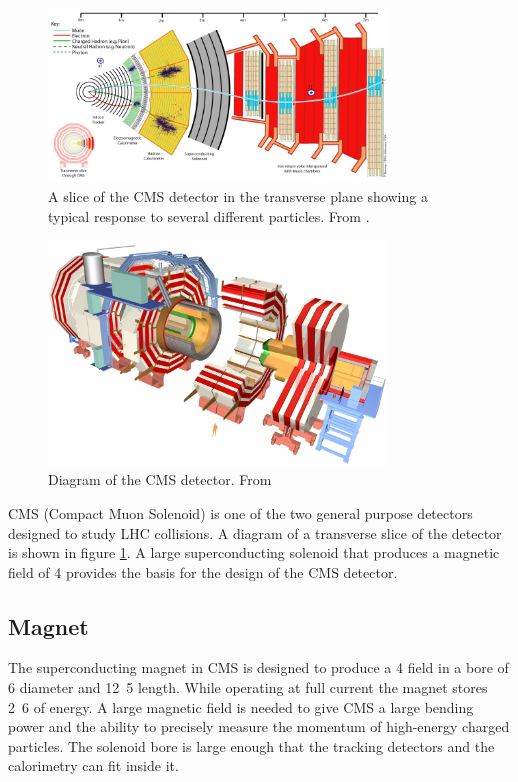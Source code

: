 \begin{figure}[htb!]
  \centering
  \includegraphics[width=0.8\textwidth]{CMS_Slice}
  \caption{A slice of the CMS detector in the transverse plane showing a
  \label{fig:CMS_Slice}
typical response to several different particles. 
From \cite{cmsSlice}.}
\end{figure}

\begin{figure}[htb!]
  \centering
  \includegraphics[width=0.8\textwidth]{CMSnc}
  \caption{Diagram of the CMS detector. From \cite{cms}}
  \label{fig:CMSnc}
\end{figure}

CMS (Compact Muon Solenoid)\cite{cms} is one of the two general purpose
detectors designed to study LHC collisions. 
A diagram of a transverse slice of the detector is shown in figure
\ref{fig:CMS_Slice}. 
A large superconducting solenoid that produces a magnetic field of
\unit{4}{\tesla} provides the basis
for the design of the CMS detector. 


\subsection{Magnet}
The superconducting magnet in CMS is designed to produce a \unit{4}{\tesla}
field in a bore of 
\unit{6}{\meter} diameter and \unit{12.5}{\meter} length.
While operating at full current the magnet stores \unit{2.6}{\giga\joule} of
energy.
A large magnetic field is needed to give CMS a large bending power and the
ability to precisely 
measure the momentum of high-energy charged particles.
The solenoid bore is large enough that the tracking detectors and the
calorimetry can fit inside it.\cite{cms}

